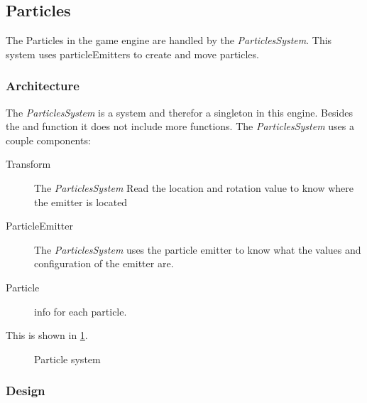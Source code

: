 \documentclass{projdoc}
\begin{document}
\subsection{Particles}

The Particles in the game engine are handled by the \emph{ParticlesSystem}. This
system uses particleEmitters to create and move particles.

\subsubsection{Architecture}

The \emph{ParticlesSystem} is a system and therefor a singleton in this engine.
Besides the  and  function it does not
include more functions. The \emph{ParticlesSystem} uses a couple
components:\noparbreak
\begin {description}
	\item[Transform] The \emph{ParticlesSystem} Read the location and rotation value to
		know where the emitter is located
	\item[ParticleEmitter] The \emph{ParticlesSystem} uses the particle emitter to know
		what the values and configuration of the emitter are.
	\item[Particle] info for each particle.
\end{description}

This is shown in \cref{fig:particle-system}.

\begin{figure}
	\centering
	\caption{Particle system}
	\label{fig:particle-system}
\end{figure}

\subsubsection{Design}
\end{document}
